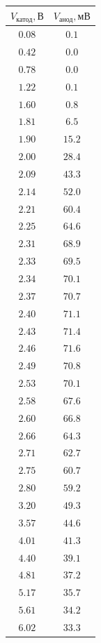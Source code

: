 \documentclass[a4paper, 12pt]{article}
\begin{document}
\begin{table}[!ht]
\begin{tabular}{|c|c|}
        $V_{катод}, В$ & $V_{анод}, мВ$\\ \hline
        $0.08$ & $0.1$\\ \hline
        $0.42$ & $0.0$\\ \hline
        $0.78$ & $0.0$\\ \hline
        $1.22$ & $0.1$\\ \hline
        $1.60$ & $0.8$\\ \hline
        $1.81$ & $6.5$\\ \hline
        $1.90$ & $15.2$\\ \hline
        $2.00$ & $28.4$\\ \hline
        $2.09$ & $43.3$\\ \hline
        $2.14$ & $52.0$\\ \hline
        $2.21$ & $60.4$\\ \hline
        $2.25$ & $64.6$\\ \hline
        $2.31$ & $68.9$\\ \hline
        $2.33$ & $69.5$\\ \hline
        $2.34$ & $70.1$\\ \hline
        $2.37$ & $70.7$\\ \hline
        $2.40$ & $71.1$\\ \hline
        $2.43$ & $71.4$\\ \hline
        $2.46$ & $71.6$\\ \hline
        $2.49$ & $70.8$\\ \hline
        $2.53$ & $70.1$\\ \hline
        $2.58$ & $67.6$\\ \hline
        $2.60$ & $66.8$\\ \hline
        $2.66$ & $64.3$\\ \hline
        $2.71$ & $62.7$\\ \hline
        $2.75$ & $60.7$\\ \hline
        $2.80$ & $59.2$\\ \hline
        $3.20$ & $49.3$\\ \hline
        $3.57$ & $44.6$\\ \hline
        $4.01$ & $41.3$\\ \hline
        $4.40$ & $39.1$\\ \hline
        $4.81$ & $37.2$\\ \hline
        $5.17$ & $35.7$\\ \hline
        $5.61$ & $34.2$\\ \hline
        $6.02$ & $33.3$\\ \hline

\end{tabular}
\end{table}
\end{document}
